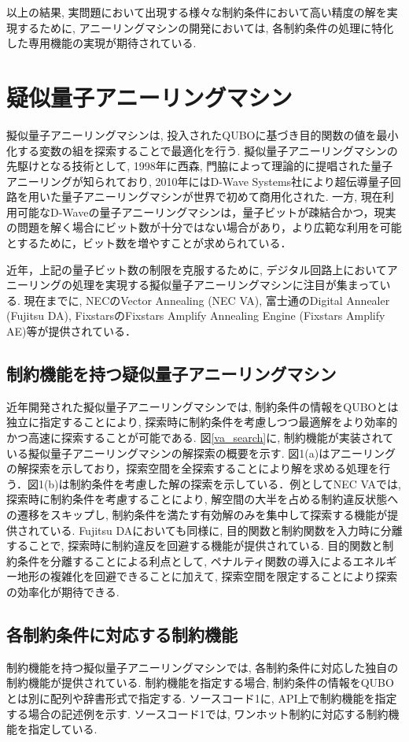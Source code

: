 \documentclass[submit,techrep,noauthor]{ipsj}
\begin{document}
以上の結果, 実問題において出現する様々な制約条件において高い精度の解を実現するために, アニーリングマシンの開発においては, 各制約条件の処理に特化した専用機能の実現が期待されている.

\section{疑似量子アニーリングマシン}
擬似量子アニーリングマシンは, 投入されたQUBOに基づき目的関数の値を最小化する変数の組を探索することで最適化を行う. 擬似量子アニーリングマシンの先駆けとなる技術として, 1998年に西森, 門脇によって理論的に提唱された量子アニーリング\cite{nishimori}が知られており, 2010年にはD-Wave Systems社により超伝導量子回路を用いた量子アニーリングマシンが世界で初めて商用化された\cite{d-wave}. 一方, 現在利用可能なD-Waveの量子アニーリングマシンは，量子ビットが疎結合かつ，現実の問題を解く場合にビット数が十分ではない場合があり，より広範な利用を可能とするために，ビット数を増やすことが求められている．

近年，上記の量子ビット数の制限を克服するために, デジタル回路上においてアニーリングの処理を実現する擬似量子アニーリングマシンに注目が集まっている. 現在までに, NECのVector Annealing (NEC VA)\cite{va}, 富士通のDigital Annealer (Fujitsu DA)\cite{da}, FixstarsのFixstars Amplify Annealing Engine (Fixstars Amplify AE)\cite{amplify}等が提供されている．

\subsection{制約機能を持つ疑似量子アニーリングマシン}
近年開発された擬似量子アニーリングマシンでは, 制約条件の情報をQUBOとは独立に指定することにより, 探索時に制約条件を考慮しつつ最適解をより効率的かつ高速に探索することが可能である. 図\ref{va_search}に, 制約機能が実装されている擬似量子アニーリングマシンの解探索の概要を示す. 図1(a)はアニーリングの解探索を示しており，探索空間を全探索することにより解を求める処理を行う．図1(b)は制約条件を考慮した解の探索を示している．例としてNEC VAでは, 探索時に制約条件を考慮することにより, 解空間の大半を占める制約違反状態への遷移をスキップし, 制約条件を満たす有効解のみを集中して探索する機能が提供されている. Fujitsu DAにおいても同様に, 目的関数と制約関数を入力時に分離することで, 探索時に制約違反を回避する機能が提供されている. 目的関数と制約条件を分離することによる利点として, ペナルティ関数の導入によるエネルギー地形の複雑化を回避できることに加えて, 探索空間を限定することにより探索の効率化が期待できる.

\subsection{各制約条件に対応する制約機能}
制約機能を持つ擬似量子アニーリングマシンでは, 各制約条件に対応した独自の制約機能が提供されている. 制約機能を指定する場合, 制約条件の情報をQUBOとは別に配列や辞書形式で指定する. ソースコード1に, API上で制約機能を指定する場合の記述例を示す. ソースコード1では, ワンホット制約に対応する制約機能を指定している.
\end{document}
